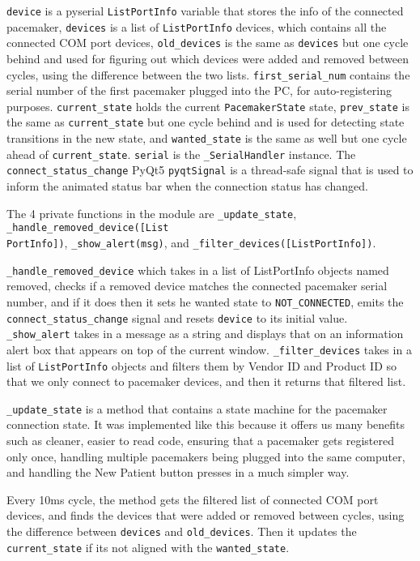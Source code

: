 \documentclass[12pt]{article}
\begin{document}
\verb|device| is a pyserial \verb|ListPortInfo| variable that stores the info of the connected pacemaker, \verb|devices| is a list of \verb|ListPortInfo| devices, which contains all the connected COM port devices, \verb|old_devices| is the same as \verb|devices| but one cycle behind and used for figuring out which devices were added and removed between cycles, using the difference between the two lists. \verb|first_serial_num| contains the serial number of the first pacemaker plugged into the PC, for auto-registering purposes. \verb|current_state| holds the current \verb|PacemakerState| state, \verb|prev_state| is the same as \verb|current_state| but one cycle behind and is used for detecting state transitions in the new state, and \verb|wanted_state| is the same as well but one cycle ahead of \verb|current_state|. \verb|serial| is the \verb|_SerialHandler| instance. The \verb|connect_status_change| PyQt5 \verb|pyqtSignal| is a thread-safe signal that is used to inform the animated status bar when the connection status has changed. 

The 4 private functions in the module are \verb|_update_state|, \verb|_handle_removed_device([List|\\\verb|PortInfo])|, \verb|_show_alert(msg)|, and \verb|_filter_devices([ListPortInfo])|. 

\verb|_handle_removed_device| which takes in a list of ListPortInfo objects named removed, checks if a removed device matches the connected pacemaker serial number, and if it does then it sets he wanted state to \verb|NOT_CONNECTED|, emits the \verb|connect_status_change| signal and resets \verb|device| to its initial value. \verb|_show_alert| takes in a message as a string and displays that on an information alert box that appears on top of the current window. \verb|_filter_devices| takes in a list of \verb|ListPortInfo| objects and filters them by Vendor ID and Product ID so that we only connect to pacemaker devices, and then it returns that filtered list.

\verb|_update_state| is a method that contains a state machine for the pacemaker connection state.
It was implemented like this because it offers us many benefits such as cleaner, easier to read code, ensuring that a pacemaker gets registered only once, handling multiple pacemakers being plugged into the same computer, and handling the New Patient button presses in a much simpler way.

Every 10ms cycle, the method gets the filtered list of connected COM port devices, and finds the devices that were added or removed between cycles, using the difference between \verb|devices| and \verb|old_devices|.
Then it updates the \verb|current_state| if its not aligned with the \verb|wanted_state|.
\end{document}
